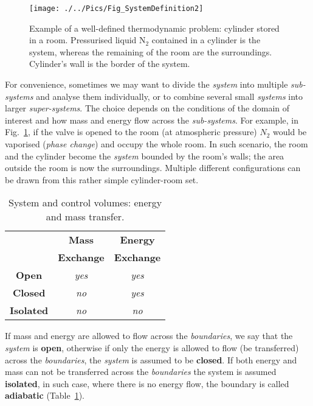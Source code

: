    \begin{figure}[h]
     \begin{center}
       \texttt{[image: ./../Pics/Fig\_SystemDefinition2]}
        \caption{Example of a well-defined thermodynamic problem: cylinder stored in a room. Pressurised liquid N$_{2}$ contained in a cylinder is the system, whereas the remaining of the room are the surroundings. Cylinder's wall is the border of the system.}\label{Chapter:Introduction:Fig:Domain2}
     \end{center}
   \end{figure}

   For convenience, sometimes we may want to divide the {\it system} into multiple {\it sub-systems} and analyse them individually, or to combine several small {\it systems} into larger {\it super-systems}. The choice depends on the conditions of the domain of interest and how mass and energy flow across the {\it sub-systems}. For example, in Fig.~\ref{Chapter:Introduction:Fig:Domain2}, if the valve is opened to the room (at atmospheric pressure) $N_{2}$ would be vaporised ({\it phase change}) and occupy the whole room. In such scenario, the room and the cylinder become the {\it system} bounded by the room's walls; the area outside the room is now the surroundings. Multiple different configurations can be drawn from this rather simple cylinder-room set.

   \begin{table}[h]
     \begin{center}
      \begin{tabular}{|c|c|c|}
         \hline
                      & {\bf Mass} & {\bf Energy} \\
                      & {\bf Exchange} & {\bf Exchange} \\
         \hline
         {\bf Open}   & {\it yes}  & {\it yes}    \\
         {\bf Closed} & {\it no}   & {\it yes}    \\
         {\bf Isolated}&{\it no}   & {\it no}     \\
         \hline 
      \end{tabular}  
        \caption{System and control volumes: energy and mass transfer.}\label{Chapter:Introduction:Table:System}
     \end{center}
   \end{table}
   
   If mass and energy are allowed to flow across the {\it boundaries}, we say that the {\it system} is {\bf open}, otherwise if only the energy is allowed to flow (\ie be transferred) across the {\it boundaries}, the {\it system} is assumed to be {\bf closed}. If both energy and mass can not be transferred across the {\it boundaries} the system is assumed {\bf isolated}, in such case, where there is no energy flow, the boundary is called {\bf adiabatic} (Table~\ref{Chapter:Introduction:Table:System}).

